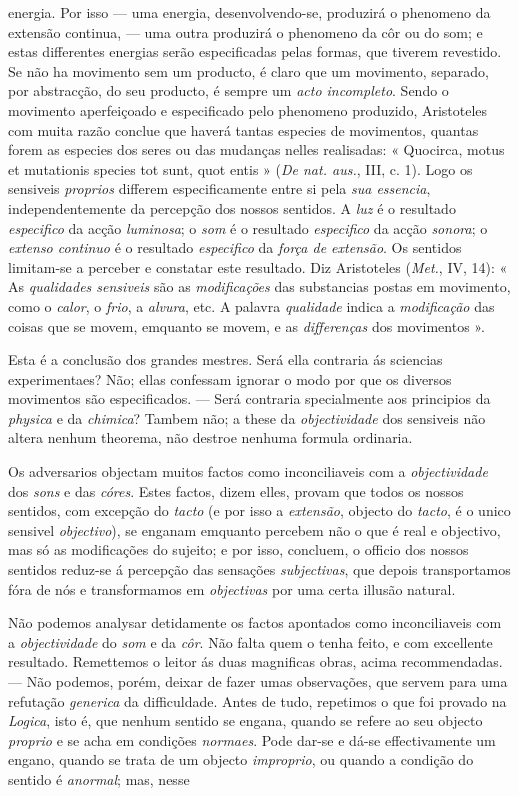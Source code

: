 energia. Por isso --- uma energia, desenvolvendo-se, produzirá o phenomeno da extensão continua, --- uma outra produzirá o phenomeno da côr ou do som; e estas differentes energias serão especificadas pelas formas, que tiverem revestido. Se não ha movimento sem um producto, é claro que um movimento, separado, por abstracção, do seu producto, é sempre um \emph{acto incompleto}. Sendo o movimento aperfeiçoado e especificado pelo phenomeno produzido, Aristoteles com muita razão conclue que haverá tantas especies de movimentos, quantas forem as especies dos seres ou das mudanças nelles realisadas: « Quocirca, motus et mutationis species tot sunt, quot entis » (\emph{De nat. aus.}, III, c. 1). Logo os sensiveis \emph{proprios} differem especificamente entre si pela \emph{sua essencia}, independentemente da percepção dos nossos sentidos. A \emph{luz} é o resultado \emph{especifico} da acção \emph{luminosa}; o \emph{som} é o resultado \emph{especifico} da acção \emph{sonora}; o \emph{extenso continuo} é o resultado \emph{especifico} da \emph{força de extensão}. Os sentidos limitam-se a perceber e constatar este resultado. Diz Aristoteles (\emph{Met.}, IV, 14): « As \emph{qualidades sensiveis} são as \emph{modificações} das substancias postas em movimento, como o \emph{calor}, o \emph{frio}, a \emph{alvura}, etc. A palavra \emph{qualidade} indica a \emph{modificação} das coisas que se movem, emquanto se movem, e as \emph{differenças} dos movimentos ».\par Esta é a conclusão dos grandes mestres. Será ella contraria ás sciencias experimentaes? Não; ellas confessam ignorar o modo por que os diversos movimentos são especificados. --- Será contraria specialmente aos principios da \emph{physica} e da \emph{chimica}? Tambem não; a these da \emph{objectividade} dos sensiveis não altera nenhum theorema, não destroe nenhuma formula ordinaria.\par Os adversarios objectam muitos factos como inconciliaveis com a \emph{objectividade} dos \emph{sons} e das \emph{córes}. Estes factos, dizem elles, provam que todos os nossos sentidos, com excepção do \emph{tacto} (e por isso a \emph{extensão}, objecto do \emph{tacto}, é o unico sensivel \emph{objectivo}), se enganam emquanto percebem não o que é real e objectivo, mas só as modificações do sujeito; e por isso, concluem, o officio dos nossos sentidos reduz-se á percepção das sensações \emph{subjectivas}, que depois transportamos fóra de nós e transformamos em \emph{objectivas} por uma certa illusão natural.\par Não podemos analysar detidamente os factos apontados como inconciliaveis com a \emph{objectividade} do \emph{som} e da \emph{côr}. Não falta quem o tenha feito, e com excellente resultado. Remettemos o leitor ás duas magnificas obras, acima recommendadas. --- Não podemos, porém, deixar de fazer umas observações, que servem para uma refutação \emph{generica} da difficuldade. Antes de tudo, repetimos o que foi provado na \emph{Logica}, isto é, que nenhum sentido se engana, quando se refere ao seu objecto \emph{proprio} e se acha em condições \emph{normaes}. Pode dar-se e dá-se effectivamente um engano, quando se trata de um objecto \emph{improprio}, ou quando a condição do sentido é \emph{anormal}; mas, nesse 